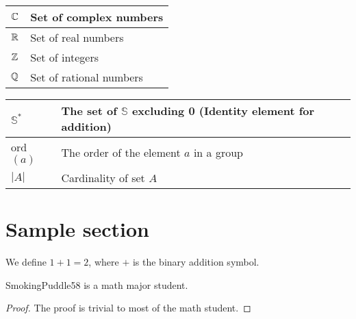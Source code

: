 \documentclass{article}
\begin{document}
\begin{center}

    \begin{tabular}{|l|l|}
        \hline
        $\mathbb{C}$ & Set of complex numbers \\ \hline
        $\mathbb{R}$ & Set of real numbers \\ \hline
        $\mathbb{Z}$ & Set of integers \\ \hline
        $\mathbb{Q}$ & Set of rational numbers \\ \hline
    \end{tabular}
\end{center}
\begin{center}
    
    \begin{tabular}{|l|l|}
        \hline
        $\mathbb{S}^{*}$ & The set of $\mathbb{S}$ excluding 0 (Identity element for addition) \\ \hline
        ord$(a)$                                       & The order of the element $a$ in a group \\ \hline
        $|A|$                                          & Cardinality of set $A$ \\
        \hline                                                           
    \end{tabular}

\end{center}


\newpage

\tableofcontents

\newpage

\setcounter{section}{-1}

\section{Sample section}

\begin{defbox}
    \begin{definition}[Addition]
        We define $1+1=2$, where $+$ is the binary addition symbol.
    \end{definition}
\end{defbox}

\begin{thmbox}
    \begin{theorem}
        SmokingPuddle58 is a math major student.
    \end{theorem}
    \begin{prfbox}
        \begin{proof}
            The proof is trivial to most of the math student.
        \end{proof}
    \end{prfbox}
\end{thmbox}
\end{document}
